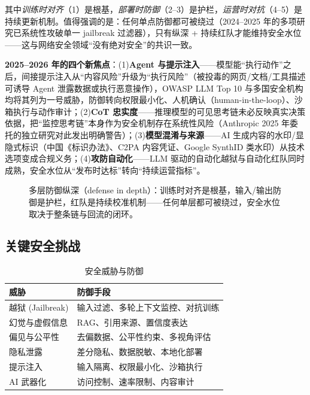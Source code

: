 \documentclass[12pt,a4paper]{article}
\begin{document}
其中\emph{训练时对齐}（1）是根基，\emph{部署时防御}（2--3）是护栏，\emph{运营时对抗}（4--5）是持续更新机制。值得强调的是：任何单点防御都可被绕过（2024--2025 年的多项研究已系统性攻破单一 jailbreak 过滤器），只有纵深 + 持续红队才能维持安全水位——这与网络安全领域“没有绝对安全”的共识一致。

\textbf{2025--2026 年的四个新焦点}：(1)\textbf{Agent 与提示注入}——模型能“执行动作”之后，间接提示注入从“内容风险”升级为“执行风险”（被投毒的网页/文档/工具描述可诱导 Agent 泄露数据或执行恶意操作），OWASP LLM Top 10 与多国安全机构均将其列为一号威胁，防御转向权限最小化、人机确认（human-in-the-loop）、沙箱执行与动作审计；(2)\textbf{CoT 忠实度}——推理模型的可见思考链未必反映真实决策依据，把“监控思考链”本身作为安全机制存在系统性风险（Anthropic 2025 年委托的独立研究对此发出明确警告）；(3)\textbf{模型混淆与来源}——AI 生成内容的水印/显隐式标识（中国《标识办法》、C2PA 内容凭证、Google SynthID 类水印）从技术选项变成合规义务；(4)\textbf{攻防自动化}——LLM 驱动的自动化越狱与自动化红队同时成熟，安全水位从“发布时达标”转向“持续运营指标”。

\begin{figure}[htbp]
\centering
\resizebox{\textwidth}{!}{%

}%
\caption{多层防御纵深（defense in depth）：训练时对齐是根基，输入/输出防御是护栏，红队是持续校准机制——任何单层都可被绕过，安全水位取决于整条链与回流的闭环。}
\label{fig:defense}
\end{figure}

\subsection{关键安全挑战}

\begin{table}[htbp]
\centering
\small
\begin{tabular}{@{}ll@{}}
\toprule
\textbf{威胁} & \textbf{防御手段}\\
\midrule
越狱 (Jailbreak) & 输入过滤、多轮上下文监控、对抗训练\\
幻觉与虚假信息 & RAG、引用来源、置信度表达\\
偏见与公平性 & 去偏数据、公平性约束、多视角评估\\
隐私泄露 & 差分隐私、数据脱敏、本地化部署\\
提示注入 & 输入隔离、权限最小化、沙箱执行\\
AI 武器化 & 访问控制、速率限制、内容审计\\
\bottomrule
\end{tabular}
\caption{安全威胁与防御}
\end{table}
\end{document}
